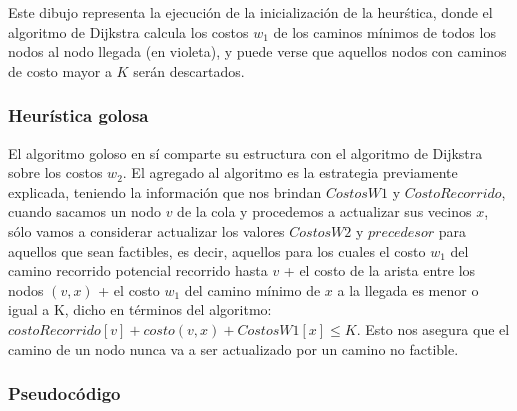 Este dibujo representa la ejecuci\'on de la inicializaci\'on de la heur\'stica, donde el algoritmo de Dijkstra calcula los costos $w_1$ de los caminos m\'inimos de todos los nodos al nodo llegada (en violeta), y puede verse que aquellos nodos con caminos de costo mayor a $K$ ser\'an descartados.

\subsubsection{Heur\'istica golosa}

El algoritmo goloso en s\'i comparte su estructura con el algoritmo de Dijkstra sobre los costos $w_2$. El agregado al algoritmo es la estrategia previamente explicada, teniendo la informaci\'on que nos brindan $CostosW1$ y $CostoRecorrido$, cuando sacamos un nodo $v$ de la cola y procedemos a actualizar sus vecinos $x$, s\'olo vamos a considerar actualizar los valores $CostosW2$ y $precedesor$ para aquellos que sean factibles, es decir, aquellos para los cuales el costo $w_1$ del camino recorrido potencial recorrido hasta $v$ + el costo de la arista entre los nodos $(v,x)$ +  el costo $w_1$ del camino m\'inimo de $x$ a la llegada es menor o igual a K, dicho en t\'erminos del algoritmo: $costoRecorrido[v]+costo(v,x)+CostosW1[x]\leq K$. Esto nos asegura que el camino de un nodo nunca va a ser actualizado por un camino no factible.

\subsubsection{Pseudoc\'odigo}


